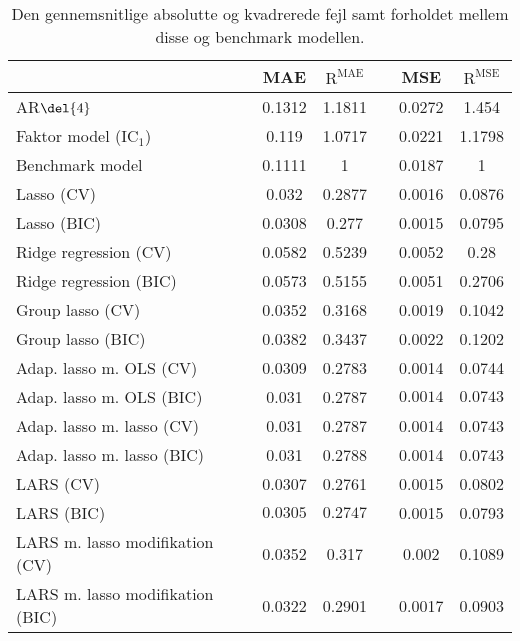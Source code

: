 \begin{table}[ht]
\center
\begin{tabular}{lccccc}
\toprule
 & MAE & \(\text{R}^{\text{MAE}}\) && MSE & \(\text{R}^{\text{MSE}}\) \\ \midrule
AR\(\del{4}\) & 0.1312 & 1.1811 && 0.0272 & 1.454 \\  
Faktor model (IC\(_1\)) & 0.119 & 1.0717 && 0.0221 & 1.1798 \\
Benchmark model & 0.1111 & 1 && 0.0187 & 1 \\
Lasso (CV) & 0.032 & 0.2877 && 0.0016 & 0.0876 \\
Lasso (BIC) & 0.0308 & 0.277 && 0.0015 & 0.0795 \\
Ridge regression (CV) & 0.0582 & 0.5239 && 0.0052 & 0.28 \\
Ridge regression (BIC) & 0.0573 & 0.5155 && 0.0051 & 0.2706 \\
Group lasso (CV) & 0.0352 & 0.3168 && 0.0019 & 0.1042  \\
Group lasso (BIC) & 0.0382 & 0.3437 && 0.0022 & 0.1202 \\
Adap. lasso m. OLS (CV) & 0.0309 & 0.2783 && 0.0014 & 0.0744 \\
Adap. lasso m. OLS (BIC) & 0.031 & 0.2787 && $\mathbf{0.0014}$ & $\mathbf{0.0743}$ \\
Adap. lasso m. lasso (CV) & 0.031 & 0.2787 && 0.0014 & 0.0743 \\
Adap. lasso m. lasso (BIC) & 0.031 & 0.2788 && 0.0014 & 0.0743 \\
LARS (CV) &  0.0307 & 0.2761 && 0.0015 & 0.0802 \\
LARS (BIC) & $\mathbf{0.0305}$ & $\mathbf{0.2747}$ && 0.0015 & 0.0793 \\
LARS m. lasso modifikation (CV) &  0.0352 & 0.317 && 0.002 & 0.1089 \\
LARS m. lasso modifikation (BIC) & 0.0322 & 0.2901 && 0.0017 & 0.0903 \\ \bottomrule
\end{tabular}
\caption{Den gennemsnitlige absolutte og kvadrerede fejl samt forholdet mellem disse og benchmark modellen.} \label{tab:mae_mse_vurdering}
\end{table}
